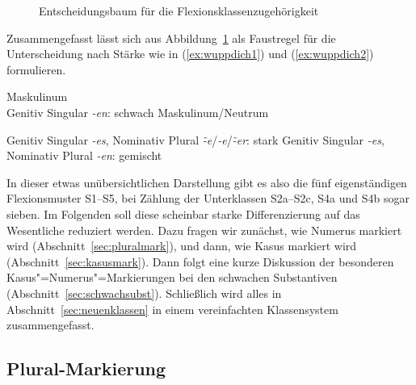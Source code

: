 \begin{figure}[!h]
  \centering
  \caption{Entscheidungsbaum für die Flexionsklassenzugehörigkeit}
  \label{fig:substklassentsch}
\end{figure}

Zusammengefasst lässt sich aus Abbildung~\ref{fig:substklassentsch} als Faustregel für die Unterscheidung nach Stärke wie in (\ref{ex:wuppdich1}) und (\ref{ex:wuppdich2}) formulieren.

\begin{exe}
  \ex\label{ex:wuppdich1} Maskulinum\\
    Genitiv Singular \textit{-en}: schwach
  \ex\label{ex:wuppdich2} Maskulinum\slash Neutrum
  \begin{xlist}
    \ex\label{ex:wuppdich2a} Genitiv Singular \textit{-es}, Nominativ Plural \textit{\~-e}/\textit{-e}/\textit{\~-er}: stark
    \ex\label{ex:wuppdich2b} Genitiv Singular \textit{-es}, Nominativ Plural \textit{-en}: gemischt
  \end{xlist}
\end{exe}

In dieser etwas unübersichtlichen Darstellung gibt es also die fünf eigenständigen Flexionsmuster S1--S5, bei Zählung der Unterklassen S2a--S2c, S4a und S4b sogar sieben.
Im Folgenden soll diese scheinbar starke Differenzierung auf das Wesentliche reduziert werden.
Dazu fragen wir zunächst, wie Numerus markiert wird (Abschnitt~\ref{sec:pluralmark}), und dann, wie Kasus markiert wird (Abschnitt~\ref{sec:kasusmark}).
Dann folgt eine kurze Diskussion der besonderen Kasus"=Numerus"=Markierungen bei den schwachen Substantiven (Abschnitt~\ref{sec:schwachsubst}).
Schließlich wird alles in Abschnitt~\ref{sec:neuenklassen} in einem vereinfachten Klassensystem zusammengefasst.

\subsection{Plural-Markierung}

